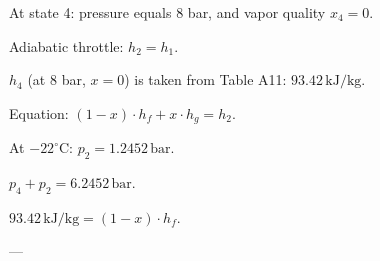 At state 4: pressure equals 8 bar, and vapor quality \( x_4 = 0 \).  

Adiabatic throttle: \( h_2 = h_1 \).  

\( h_4 \) (at 8 bar, \( x = 0 \)) is taken from Table A11: \( 93.42 \, \text{kJ/kg} \).  

Equation:  
\( (1 - x) \cdot h_f + x \cdot h_g = h_2 \).  

At \( -22^\circ \text{C} \):  
\( p_2 = 1.2452 \, \text{bar} \).  

\( p_4 + p_2 = 6.2452 \, \text{bar} \).  

\( 93.42 \, \text{kJ/kg} = (1 - x) \cdot h_f \).  

---